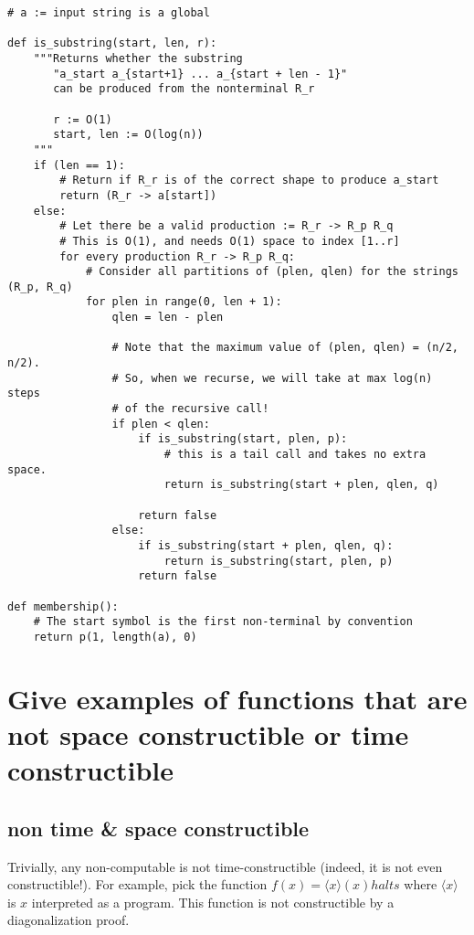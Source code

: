 \documentclass{article}
\begin{document}
\begin{verbatim}
# a := input string is a global

def is_substring(start, len, r):
    """Returns whether the substring 
       "a_start a_{start+1} ... a_{start + len - 1}"
       can be produced from the nonterminal R_r

       r := O(1)
       start, len := O(log(n))
    """
    if (len == 1):
        # Return if R_r is of the correct shape to produce a_start
        return (R_r -> a[start])
    else:
        # Let there be a valid production := R_r -> R_p R_q
        # This is O(1), and needs O(1) space to index [1..r]
        for every production R_r -> R_p R_q:
            # Consider all partitions of (plen, qlen) for the strings (R_p, R_q)
            for plen in range(0, len + 1):
                qlen = len - plen

                # Note that the maximum value of (plen, qlen) = (n/2, n/2).
                # So, when we recurse, we will take at max log(n) steps
                # of the recursive call!
                if plen < qlen:
                    if is_substring(start, plen, p):
                        # this is a tail call and takes no extra space.
                        return is_substring(start + plen, qlen, q)

                    return false
                else:
                    if is_substring(start + plen, qlen, q):
                        return is_substring(start, plen, p)
                    return false

def membership():
    # The start symbol is the first non-terminal by convention
    return p(1, length(a), 0)
\end{verbatim}



\section{Give examples of functions that are not space constructible or time constructible}
\subsection{non time \& space constructible}
Trivially, any non-computable is not time-constructible (indeed, it is
not even constructible!). For example, pick the function $f(x) = \langle x \rangle (x) halts$
where $\langle x \rangle$ is $x$ interpreted as a program. This function
is not constructible by a diagonalization proof.
\end{document}
